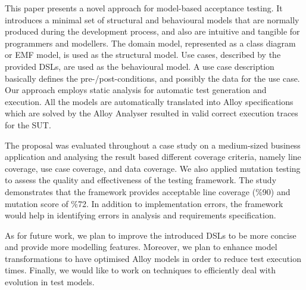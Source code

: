 %
%
This paper presents a novel approach for model-based acceptance testing. It introduces a minimal set of structural and behavioural models that are normally produced during the development process, and also are intuitive and tangible for programmers and modellers. The domain model, represented as a class diagram or EMF model, is used as the structural model. Use cases, described by the provided DSLs, are used as the behavioural model. A use case description basically defines the pre-/post-conditions, and possibly the data for the use case.
Our approach employs static analysis for automatic test generation and execution. All the models are automatically translated into Alloy specifications which are solved by the Alloy Analyser resulted in valid correct execution traces for the SUT.

The proposal was evaluated throughout a case study on a medium-sized business application and analysing the result based different coverage criteria, namely line coverage, use case coverage, and data coverage. We also applied mutation testing to assess the quality and effectiveness of the testing framework. The study demonstrates that the framework provides acceptable line coverage (\%90) and mutation score of \%72. In addition to implementation errors, the framework would help in identifying errors in analysis and requirements specification.

As for future work, we plan to improve the introduced DSLs to be more concise and provide more modelling features. Moreover, we plan to enhance model transformations to have optimised Alloy models in order to reduce test execution times. Finally, we would like to work on techniques to efficiently deal with evolution in test models.


